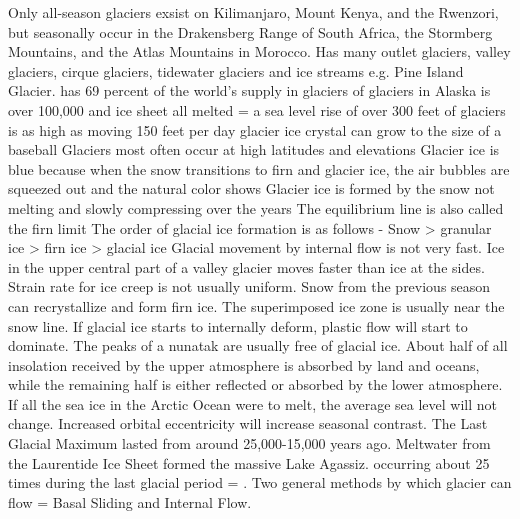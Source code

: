 		     Only all-season glaciers exsist on Kilimanjaro, Mount Kenya, and the Rwenzori, but seasonally occur in the Drakensberg Range of South Africa, the Stormberg Mountains, and the Atlas Mountains in Morocco.
		     Has many outlet glaciers, valley glaciers, cirque glaciers, tidewater glaciers and ice streams e.g. Pine Island Glacier. 
		     has 69 percent of the world's supply in glaciers
		     of glaciers in Alaska is over 100,000
		     and ice sheet all melted = a sea level rise of over 300 feet
		     of glaciers is as high as moving 150 feet per day
		     glacier ice crystal can grow to the size of a baseball
		    \ddd Glaciers most often occur at high latitudes and elevations
		    \ddd Glacier ice is blue because when the snow transitions to firn and glacier ice, \ddd the air bubbles are squeezed out and the natural color shows
		    \ddd Glacier ice is formed by the snow not melting and slowly compressing over the years
		    \ddd The equilibrium line is also called the firn limit 
		    \ddd The order of glacial ice formation is as follows - Snow > granular ice > firn ice > glacial ice
	\ddd Glacial movement by internal flow is not very fast. 
	\ddd Ice in the upper central part of a valley glacier moves faster than ice at the sides.
	\ddd Strain rate for ice creep is not usually uniform.
	\ddd Snow from the previous season can recrystallize and form firn ice.
	\ddd The superimposed ice zone is usually near the snow line.
	\ddd If glacial ice starts to internally deform, plastic flow will start to dominate.
	\ddd The peaks of a nunatak are usually free of glacial ice.
	\ddd About half of all insolation received by the upper atmosphere is absorbed by land and oceans, while the remaining half is either reflected or absorbed by the lower atmosphere.
	\ddd If all the sea ice in the Arctic Ocean were to melt, the average sea level will not change.
	\ddd Increased orbital eccentricity will increase seasonal contrast.
	\ddd The Last Glacial Maximum lasted from around 25,000-15,000 years ago.
	\ddd Meltwater from the Laurentide Ice Sheet formed the massive Lake Agassiz.
	\ddd {} occurring about 25 times during the last glacial period = . 
	\ddd Two general methods by which glacier can flow = Basal Sliding and Internal Flow. 